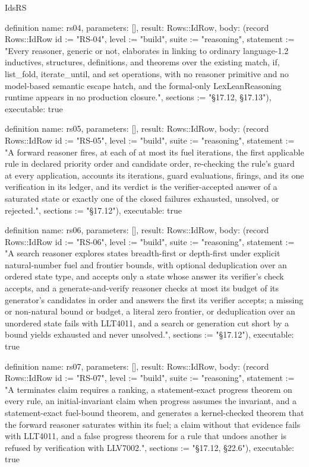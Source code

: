 \begin{lexlean}{IdsRS}
\begin{semanticmodule}
definition{
  name: rs04,
  parameters: [],
  result: Rows::IdRow,
  body: (record Rows::IdRow {id := "RS-04", level := "build", suite := "reasoning", statement := "Every reasoner, generic or not, elaborates in linking to ordinary language-1.2 inductives, structures, definitions, and theorems over the existing match, if, list_fold, iterate_until, and set operations, with no reasoner primitive and no model-based semantic escape hatch, and the formal-only LexLeanReasoning runtime appears in no production closure.", sections := "§17.12, §17.13"}),
  executable: true
}

definition{
  name: rs05,
  parameters: [],
  result: Rows::IdRow,
  body: (record Rows::IdRow {id := "RS-05", level := "build", suite := "reasoning", statement := "A forward reasoner fires, at each of at most its fuel iterations, the first applicable rule in declared priority order and candidate order, re-checking the rule's guard at every application, accounts its iterations, guard evaluations, firings, and its one verification in its ledger, and its verdict is the verifier-accepted answer of a saturated state or exactly one of the closed failures exhausted, unsolved, or rejected.", sections := "§17.12"}),
  executable: true
}

definition{
  name: rs06,
  parameters: [],
  result: Rows::IdRow,
  body: (record Rows::IdRow {id := "RS-06", level := "build", suite := "reasoning", statement := "A search reasoner explores states breadth-first or depth-first under explicit natural-number fuel and frontier bounds, with optional deduplication over an ordered state type, and accepts only a state whose answer its verifier's check accepts, and a generate-and-verify reasoner checks at most its budget of its generator's candidates in order and answers the first its verifier accepts; a missing or non-natural bound or budget, a literal zero frontier, or deduplication over an unordered state fails with LLT4011, and a search or generation cut short by a bound yields exhausted and never unsolved.", sections := "§17.12"}),
  executable: true
}

definition{
  name: rs07,
  parameters: [],
  result: Rows::IdRow,
  body: (record Rows::IdRow {id := "RS-07", level := "build", suite := "reasoning", statement := "A terminates claim requires a ranking, a statement-exact progress theorem on every rule, an initial-invariant claim when progress assumes the invariant, and a statement-exact fuel-bound theorem, and generates a kernel-checked theorem that the forward reasoner saturates within its fuel; a claim without that evidence fails with LLT4011, and a false progress theorem for a rule that undoes another is refused by verification with LLV7002.", sections := "§17.12, §22.6"}),
  executable: true
}


\end{semanticmodule}
\end{lexlean}
